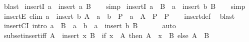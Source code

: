 \begin{isabellebody}
\ blast%
\endisatagproof
{\isafoldproof}%
%
\isadelimproof
\isanewline
%
\endisadelimproof
\isanewline
{}\isamarkupfalse%
\ insertI{}{\isacharcolon}{\kern0pt}\ {\isachardoublequoteopen}a\ {\isasymin}\ insert\ a\ B{\isachardoublequoteclose}\isanewline
%
\isadelimproof
\ \ %
\endisadelimproof
%
\isatagproof
{}\isamarkupfalse%
\ simp%
\endisatagproof
{\isafoldproof}%
%
\isadelimproof
\isanewline
%
\endisadelimproof
\isanewline
{}\isamarkupfalse%
\ insertI{}{\isacharcolon}{\kern0pt}\ {\isachardoublequoteopen}a\ {\isasymin}\ B\ {\isasymLongrightarrow}\ a\ {\isasymin}\ insert\ b\ B{\isachardoublequoteclose}\isanewline
%
\isadelimproof
\ \ %
\endisadelimproof
%
\isatagproof
{}\isamarkupfalse%
\ simp%
\endisatagproof
{\isafoldproof}%
%
\isadelimproof
\isanewline
%
\endisadelimproof
\isanewline
{}\isamarkupfalse%
\ insertE\ {\isacharbrackleft}{\kern0pt}elim{\isacharbang}{\kern0pt}{\isacharbrackright}{\kern0pt}{\isacharcolon}{\kern0pt}\ {\isachardoublequoteopen}a\ {\isasymin}\ insert\ b\ A\ {\isasymLongrightarrow}\ {\isacharparenleft}{\kern0pt}a\ {\isacharequal}{\kern0pt}\ b\ {\isasymLongrightarrow}\ P{\isacharparenright}{\kern0pt}\ {\isasymLongrightarrow}\ {\isacharparenleft}{\kern0pt}a\ {\isasymin}\ A\ {\isasymLongrightarrow}\ P{\isacharparenright}{\kern0pt}\ {\isasymLongrightarrow}\ P{\isachardoublequoteclose}\isanewline
%
\isadelimproof
\ \ %
\endisadelimproof
%
\isatagproof
{}\isamarkupfalse%
\ insert{\isacharunderscore}{\kern0pt}def\ \isamarkupfalse%
\ blast%
\endisatagproof
{\isafoldproof}%
%
\isadelimproof
\isanewline
%
\endisadelimproof
\isanewline
{}\isamarkupfalse%
\ insertCI\ {\isacharbrackleft}{\kern0pt}intro{\isacharbang}{\kern0pt}{\isacharbrackright}{\kern0pt}{\isacharcolon}{\kern0pt}\ {\isachardoublequoteopen}{\isacharparenleft}{\kern0pt}a\ {\isasymnotin}\ B\ {\isasymLongrightarrow}\ a\ {\isacharequal}{\kern0pt}\ b{\isacharparenright}{\kern0pt}\ {\isasymLongrightarrow}\ a\ {\isasymin}\ insert\ b\ B{\isachardoublequoteclose}\isanewline
\ \ %
\isanewline
%
\isadelimproof
\ \ %
\endisadelimproof
%
\isatagproof
{}\isamarkupfalse%
\ auto%
\endisatagproof
{\isafoldproof}%
%
\isadelimproof
\isanewline
%
\endisadelimproof
\isanewline
{}\isamarkupfalse%
\ subset{\isacharunderscore}{\kern0pt}insert{\isacharunderscore}{\kern0pt}iff{\isacharcolon}{\kern0pt}\ {\isachardoublequoteopen}A\ {\isasymsubseteq}\ insert\ x\ B\ {\isasymlongleftrightarrow}\ {\isacharparenleft}{\kern0pt}if\ x\ {\isasymin}\ A\ then\ A\ {\isacharminus}{\kern0pt}\ {\isacharbraceleft}{\kern0pt}x{\isacharbraceright}{\kern0pt}\ {\isasymsubseteq}\ B\ else\ A\ {\isasymsubseteq}\ B{\isacharparenright}{\kern0pt}{\isachardoublequoteclose}\isanewline

\end{isabellebody}
